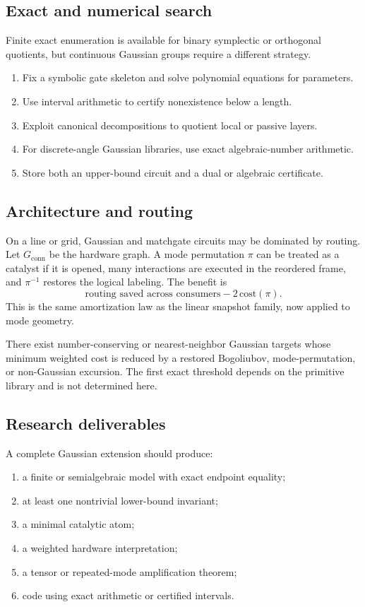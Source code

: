 \subsection{Exact and numerical search}
Finite exact enumeration is available for binary symplectic or orthogonal quotients, but continuous Gaussian groups require a different strategy.
\begin{enumerate}
\item Fix a symbolic gate skeleton and solve polynomial equations for parameters.
\item Use interval arithmetic to certify nonexistence below a length.
\item Exploit canonical decompositions to quotient local or passive layers.
\item For discrete-angle Gaussian libraries, use exact algebraic-number arithmetic.
\item Store both an upper-bound circuit and a dual or algebraic certificate.
\end{enumerate}

\subsection{Architecture and routing}
On a line or grid, Gaussian and matchgate circuits may be dominated by routing.  Let $G_{\mathrm{conn}}$ be the hardware graph.  A mode permutation $\pi$ can be treated as a catalyst if it is opened, many interactions are executed in the reordered frame, and $\pi^{-1}$ restores the logical labeling.  The benefit is
\[
\text{routing saved across consumers}
-
2\,\text{cost}(\pi).
\]
This is the same amortization law as the linear snapshot family, now applied to mode geometry.

\begin{conjecturebox}
There exist number-conserving or nearest-neighbor Gaussian targets whose minimum weighted cost is reduced by a restored Bogoliubov, mode-permutation, or non-Gaussian excursion.  The first exact threshold depends on the primitive library and is not determined here.
\end{conjecturebox}

\subsection{Research deliverables}
A complete Gaussian extension should produce:
\begin{enumerate}
\item a finite or semialgebraic model with exact endpoint equality;
\item at least one nontrivial lower-bound invariant;
\item a minimal catalytic atom;
\item a weighted hardware interpretation;
\item a tensor or repeated-mode amplification theorem;
\item code using exact arithmetic or certified intervals.
\end{enumerate}

